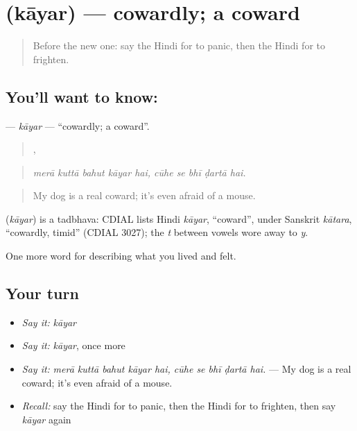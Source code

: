 \section[\texorpdfstring{\hi{कायर} (kāyar)}{कायर (kāyar)}]{ (kāyar) — cowardly; a coward}

\label{lesson:HI-C457-kayar}



\begin{quote}
Before the new one: say the Hindi for to panic, then the Hindi for to frighten.
\end{quote}

\subsection*{You'll want to know: }
\textbf{} — \emph{kāyar} — \textquotedblleft{}cowardly; a coward\textquotedblright{}.

\begin{quote}
    ,     
\end{quote}

\begin{quote}
\emph{merā kuttā bahut kāyar hai, cūhe se bhī ḍartā hai.}
\end{quote}

\begin{quote}
My dog is a real coward; it's even afraid of a mouse.
\end{quote}

\begin{cousinweb}
\textbf{} (\emph{kāyar}) is a tadbhava: CDIAL lists Hindi \emph{kāyar}, \textquotedblleft{}coward\textquotedblright{}, under Sanskrit \emph{kātara}, \textquotedblleft{}cowardly, timid\textquotedblright{} (CDIAL 3027); the \emph{t} between vowels wore away to \emph{y}.
\end{cousinweb}

\begin{grammarlens}[title={What you've built}]
One more word for describing what you lived and felt.
\end{grammarlens}

\subsection*{Your turn}
\begin{itemize}
\raggedright
  \item \emph{Say it:} \emph{kāyar}
  \item \emph{Say it:} \emph{kāyar}, once more
  \item \emph{Say it:} \emph{merā kuttā bahut kāyar hai, cūhe se bhī ḍartā hai.} — My dog is a real coward; it's even afraid of a mouse.
  \item \emph{Recall:} say the Hindi for to panic, then the Hindi for to frighten, then say \emph{kāyar} again
\end{itemize}

